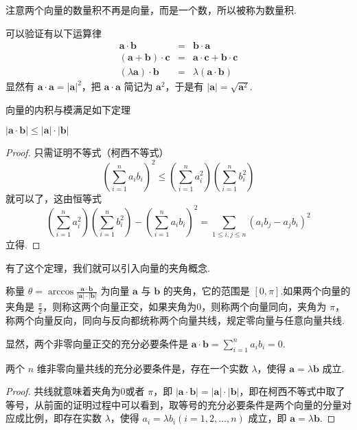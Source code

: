 注意两个向量的数量积不再是向量，而是一个数，所以被称为数量积.

可以验证有以下运算律
\begin{eqnarray*}
  \bm{a} \cdot \bm{b} & = & \bm{b} \cdot \bm{a}\\
  (\bm{a}+\bm{b}) \cdot \bm{c} & = & \bm{a} \cdot
  \bm{c}+\bm{b} \cdot \bm{c}\\
  (\lambda \bm{a}) \cdot \bm{b} & = & \lambda (\bm{a} \cdot
  \bm{b})
\end{eqnarray*}
显然有 $\bm{a} \cdot \bm{a}= | \bm{a} |^2$，把
$\bm{a} \cdot \bm{a}$ 简记为 $\bm{a}^2$，于是有 $|
\bm{a} | = \sqrt{\bm{a}^2}$.

向量的内积与模满足如下定理

\begin{theorem}
  $| \bm{a} \cdot \bm{b} | \leqslant | \bm{a} | \cdot |
  \bm{b} |$
\end{theorem}

\begin{proof}
  只需证明不等式（柯西不等式）
  \[ \left( \sum_{i = 1}^n a_i b_i \right)^2 \leqslant \left( \sum_{i = 1}^n
     a_i^2 \right) \left( \sum_{i = 1}^n b_i^2 \right) \]
  就可以了，这由恒等式
  \[ \left( \sum_{i = 1}^n a_i^2 \right) \left( \sum_{i = 1}^n b_i^2 \right) -
     \left( \sum_{i = 1}^n a_i b_i \right)^2 = \sum_{1 \leqslant i, j
     \leqslant n} (a_i b_j - a_j b_i)^2 \]
  立得.
\end{proof}

有了这个定理，我们就可以引入向量的夹角概念.

\begin{definition}
  称量 $\theta = \arccos \frac{\bm{a} \cdot \bm{b}}{|
  \bm{a} | \cdot | \bm{b} |}$ 为向量 $\bm{a}$ 与
  $\bm{b}$ 的夹角，它的范围是 $[0,
  \pi]$.如果两个向量的夹角是
  $\frac{\pi}{2}$，则称这两个向量正交，如果夹角为0，则称两个向量同向，夹角为
  $\pi$，称两个向量反向，同向与反向都统称两个向量共线，规定零向量与任意向量共线.
\end{definition}

显然，两个非零向量正交的充分必要条件是 $\bm{a} \cdot
\bm{b}= \sum_{i = 1}^n a_i b_i = 0$.

\begin{theorem}
  两个 $n$
  维非零向量共线的充分必要条件是，存在一个实数
  $\lambda$，使得 $\bm{a}= \lambda \bm{b}$ 成立.
\end{theorem}

\begin{proof}
  共线就意味着夹角为0或者 $\pi$，即 $| \bm{a} \cdot
  \bm{b} | = | \bm{a} | \cdot | \bm{b}
  |$，即在柯西不等式中取了等号，从前面的证明过程中可以看到，取等号的充分必要条件是两个向量的分量对应成比例，即存在实数
  $\lambda$，使得 $a_i = \lambda b_i (i = 1, 2, \ldots, n)$ 成立，即
  $\bm{a}= \lambda \bm{b}$.
\end{proof}

